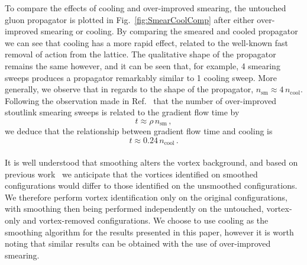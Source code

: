 To compare the effects of cooling and over-improved smearing, the untouched gluon propagator is plotted in Fig.~\ref{fig:SmearCoolComp} after either over-improved smearing or cooling. By comparing the smeared and cooled propagator we can see that cooling has a more rapid effect, related to the well-known fast removal of action from the lattice. The qualitative shape of the propagator remains the same however, and it can be seen that, for example, 4 smearing sweeps produces a propagator remarkably similar to 1 cooling sweep. More generally, we observe that in regards to the shape of the propagator, $n_{\text{sm}}\approx4\,n_{\text{cool}}$. Following the observation made in Ref.~\cite{Thomas:2014tda} that the number of over-improved stoutlink smearing sweeps is related to the gradient flow time by
%
\begin{equation}
t\approx\rho\,n_{\text{sm}}\, ,
\end{equation}
%
we deduce that the relationship between gradient flow time and cooling is
\begin{equation}
t\approx0.24\,n_{\text{cool}}\,.
\end{equation}\\

It is well understood that smoothing alters the vortex background, and based on previous work~\cite{Cais:2008za,Trewartha:2015ida,DelDebbio:1998luz} we anticipate that the vortices identified on smoothed configurations would differ to those identified on the unsmoothed configurations. We therefore perform vortex identification only on the original configurations, with smoothing then being performed independently on the untouched, vortex-only and vortex-removed configurations. We choose to use cooling as the smoothing algorithm for the results presented in this paper, however it is worth noting that similar results can be obtained with the use of over-improved smearing. 


